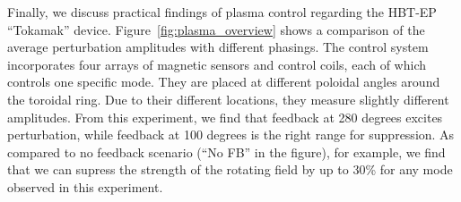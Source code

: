 Finally, we discuss practical findings of plasma control regarding the
HBT-EP ``Tokamak'' device.
Figure~\ref{fig:plasma_overview} shows a comparison of the average
perturbation amplitudes with different phasings.
The control system incorporates four arrays of magnetic sensors and
control coils, each of which controls one specific mode.
They are placed at different poloidal angles around the toroidal ring.
Due to their different locations, they measure slightly different
amplitudes.
From this experiment, we find that feedback at 280 degrees excites
perturbation, while feedback at 100 degrees is the right range for
suppression.
As compared to no feedback scenario (``No FB'' in the figure), for
example, we find that we can supress the strength of the rotating field
by up to 30\% for any mode observed in this experiment.